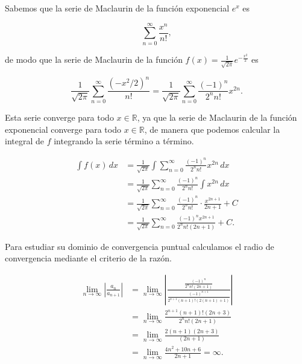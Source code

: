 \documentclass[
  spanish,
  a4paper,
]{scrreport}
\theoremstyle{definition}
\theoremstyle{remark}
\begin{document}
\begin{tcolorbox}[enhanced jigsaw, colbacktitle=quarto-callout-tip-color!10!white, opacityback=0, toptitle=1mm, title=\textcolor{quarto-callout-tip-color}{\faLightbulb}\hspace{0.5em}{Solución}, coltitle=black, opacitybacktitle=0.6, breakable, toprule=.15mm, leftrule=.75mm, titlerule=0mm, colframe=quarto-callout-tip-color-frame, left=2mm, bottomrule=.15mm, bottomtitle=1mm, arc=.35mm, rightrule=.15mm, colback=white]

Sabemos que la serie de Maclaurin de la función exponencial \(e^x\) es

\[
\sum_{n=0}^\infty \frac{x^n}{n!},
\]

de modo que la serie de Maclaurin de la función
\(f(x) = \frac{1}{\sqrt{2\pi}}e^{-\frac{x^2}{2}}\) es

\[
\frac{1}{\sqrt{2\pi}}\sum_{n=0}^\infty \frac{(-x^2/2)^n}{n!}
= \frac{1}{\sqrt{2\pi}}\sum_{n=0}^\infty \frac{(-1)^n}{2^n n!} x^{2n}.
\]

Esta serie converge para todo \(x \in \mathbb{R}\), ya que la serie de
Maclaurin de la función exponencial converge para todo
\(x \in \mathbb{R}\), de manera que podemos calcular la integral de
\(f\) integrando la serie término a término.

\begin{align*}
\int f(x)\,dx 
&= \frac{1}{\sqrt{2\pi}}\int \sum_{n=0}^\infty \frac{(-1)^n}{2^n n!} x^{2n}\,dx \\
&= \frac{1}{\sqrt{2\pi}}\sum_{n=0}^\infty \frac{(-1)^n}{2^n n!} \int x^{2n}\,dx \\
&= \frac{1}{\sqrt{2\pi}}\sum_{n=0}^\infty \frac{(-1)^n}{2^n n!} \cdot \frac{x^{2n+1}}{2n+1} + C \\
&= \frac{1}{\sqrt{2\pi}}\sum_{n=0}^\infty \frac{(-1)^n x^{2n+1}}{2^n n!(2n+1)} + C.
\end{align*}

Para estudiar su dominio de convergencia puntual calculamos el radio de
convergencia mediante el criterio de la razón.

\begin{align*}
\lim_{n \to \infty} \left| \frac{a_n}{a_{n+1}} \right|
&= \lim_{n \to \infty} \left| \frac{\frac{(-1)^n}{2^n n!(2n+1)}}{\frac{(-1)^{n+1}}{2^{n+1} (n+1)!(2(n+1)+1)}} \right| \\
&= \lim_{n \to \infty} \frac{2^{n+1} (n+1)!(2n+3)}{2^n n!(2n+1)}\\
&= \lim_{n \to \infty} \frac{2(n+1)(2n+3)}{(2n+1)} \\
&= \lim_{n \to \infty} \frac{4n^2+10n+6}{2n+1} 
= \infty.
\end{align*}


\end{tcolorbox}
\end{document}
